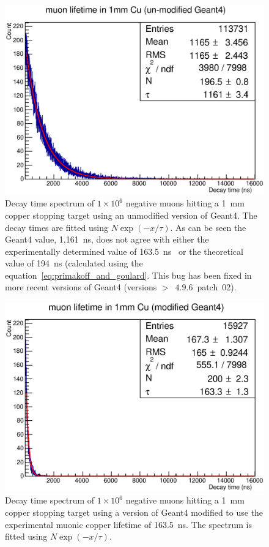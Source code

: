\begin{figure}[hptb]
  \centering
    \includegraphics[width=.7\textwidth]{images/mu-_lifetime_in_cu_unmodded_g4.eps}
  \caption{Decay time spectrum of \(1\times10^6\) negative muons hitting a 1~mm copper stopping target using an unmodified version of Geant4. The decay times are fitted using \(N\exp(-x/\tau)\). As can be seen the Geant4 value, 1,161~ns, does not agree with either the experimentally determined value of 163.5~ns~\cite{suzuki_mu_capture_rates} or the theoretical value of 194~ns (calculated using the equation~\ref{eq:primakoff_and_goulard}. This bug has been fixed in more recent versions of Geant4 (versions \(>\)~\( 4.9.6 \)~patch~02).}
  \label{fig:images_mu-_lifetime_in_cu_unmodded_g4}
\end{figure}

\begin{figure}[hptb]
  \centering
    \includegraphics[width=.7\textwidth]{images/mu-_lifetime_in_cu_modded_g4.eps}
  \caption{Decay time spectrum of \(1\times10^6\) negative muons hitting a 1~mm copper stopping target using a version of Geant4 modified to use the experimental muonic copper lifetime of 163.5~ns. The spectrum is fitted using \(N\exp(-x/\tau)\).}
  \label{fig:images_mu-_lifetime_in_cu_modded_g4}
\end{figure}


